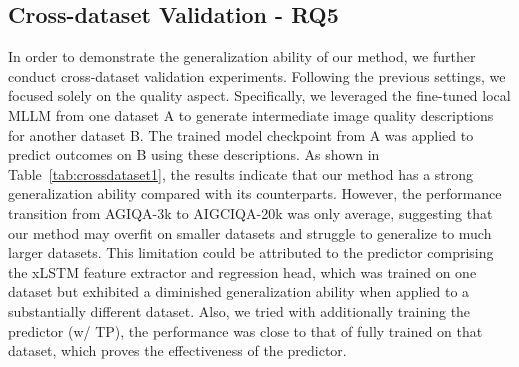 \subsection{Cross-dataset Validation - RQ5}

In order to demonstrate the generalization ability of our method, we further conduct cross-dataset validation experiments. 
Following the previous settings, we focused solely on the quality aspect.
Specifically, we leveraged the fine-tuned local MLLM from one dataset A to generate intermediate image quality descriptions for another dataset B.
The trained model checkpoint from A was applied to predict outcomes on B using these descriptions.
As shown in Table~\ref{tab:crossdataset1}, the results indicate that our method has a strong generalization ability compared with its counterparts.
However, the performance transition from AGIQA-3k to AIGCIQA-20k was only average, suggesting that our method may overfit on smaller datasets and struggle to generalize to much larger datasets.
This limitation could be attributed to the predictor comprising the xLSTM feature extractor and regression head, which was trained on one dataset but exhibited a diminished generalization ability when applied to a substantially different dataset.
Also, we tried with additionally training the predictor (w/ TP), the performance was close to that of fully trained on that dataset, which proves the effectiveness of the predictor. 
